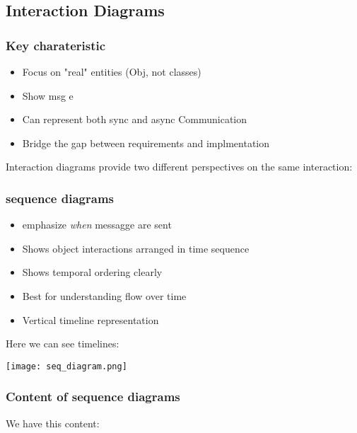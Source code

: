 \subsection{Interaction Diagrams}
\subsubsection{Key charateristic}
\begin{itemize}
    \item Focus on "real" entities (Obj, not classes)
    \item Show msg e    
    \item Can represent both sync and async Communication
    \item Bridge the gap between requirements and implmentation
\end{itemize}


Interaction diagrams provide two different perspectives on the same interaction:

\subsubsection{sequence diagrams}
\begin{itemize}
    \item emphasize \textit{when} messagge are sent
    \item Shows object interactions arranged in time sequence
    \item Shows temporal ordering clearly
    \item Best for understanding flow over time
    \item Vertical timeline representation
\end{itemize}

Here we can see timelines:
\begin{center}
    \texttt{[image: seq\_diagram.png]}
\end{center}

\subsubsection{Content of sequence diagrams}
We have this content:

